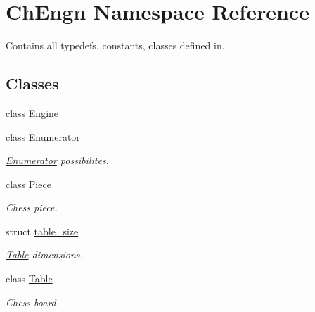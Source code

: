 \hypertarget{namespaceChEngn}{
\section{ChEngn Namespace Reference}
\label{namespaceChEngn}
}


Contains all typedefs, constants, classes defined in.  


\subsection*{Classes}
\begin{DoxyCompactItemize}
\item 
class \hyperlink{classChEngn_1_1Engine}{Engine}
\item 
class \hyperlink{classChEngn_1_1Enumerator}{Enumerator}
\begin{DoxyCompactList}\small\item\em \hyperlink{classChEngn_1_1Enumerator}{Enumerator} possibilites. \item\end{DoxyCompactList}\item 
class \hyperlink{classChEngn_1_1Piece}{Piece}
\begin{DoxyCompactList}\small\item\em Chess piece. \item\end{DoxyCompactList}\item 
struct \hyperlink{structChEngn_1_1table__size}{table\_\-size}
\begin{DoxyCompactList}\small\item\em \hyperlink{classChEngn_1_1Table}{Table} dimensions. \item\end{DoxyCompactList}\item 
class \hyperlink{classChEngn_1_1Table}{Table}
\begin{DoxyCompactList}\small\item\em Chess board. \item\end{DoxyCompactList}\end{DoxyCompactItemize}
